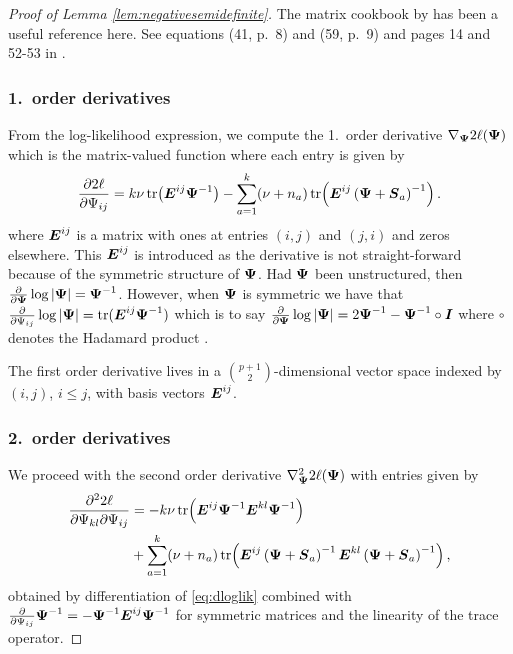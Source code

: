 \documentclass{article}\usepackage[]{graphicx}\usepackage[]{color}
\begin{document}
\begin{proof}[Proof of Lemma \ref{lem:negativesemidefinite}]

The matrix cookbook by \citet{Petersen2008} has been a useful reference here. See equations (41, p.\ 8) and (59, p.\ 9) and pages 14 and 52-53 in \citep{Petersen2008}.

\subsubsection*{1.\ order derivatives}
From the log-likelihood expression, we compute the 1.\ order derivative $\nabla_{\boldsymbol{\Psi}} 2\ell({\boldsymbol{\Psi}})$ which is the matrix-valued function where each entry is given by
\begin{align}
  \frac{\partial 2\ell}{\partial \Psi_{ij}}
  = k\nu\operatorname*{tr}\!\left({\boldsymbol{E}}^{ij}{\boldsymbol{\Psi}}^{-1}\right)
    - \sum_{a = 1}^k (\nu + n_a)\operatorname*{tr}\!\left({\boldsymbol{E}}^{ij}\left({\boldsymbol{\Psi}} + {\boldsymbol{S}}_a\right)^{-1}\right).
\label{eq:dloglik}
\end{align}
where ${\boldsymbol{E}}^{ij}$ is a matrix with ones at entries $(i,j)$ and $(j,i)$ and zeros elsewhere.
This ${\boldsymbol{E}}^{ij}$ is introduced as the derivative is not straight-forward because of the symmetric structure of ${\boldsymbol{\Psi}}$. Had ${\boldsymbol{\Psi}}$ been unstructured, then $\frac{\partial}{\partial {\boldsymbol{\Psi}}}\log|{\boldsymbol{\Psi}}| = {\boldsymbol{\Psi}}^{-1}$.
However, when ${\boldsymbol{\Psi}}$ is symmetric we have that $\frac{\partial}{\partial \Psi_{ij}}\log|{\boldsymbol{\Psi}}| = \operatorname*{tr}({\boldsymbol{E}}^{ij}{\boldsymbol{\Psi}}^{-1})$ which is to say $\frac{\partial}{\partial {\boldsymbol{\Psi}}}\log|{\boldsymbol{\Psi}}| = 2{\boldsymbol{\Psi}}^{-1} -{\boldsymbol{\Psi}}^{-1} \circ {\boldsymbol{I}}$ where $\circ$ denotes the Hadamard product \citep[eq.\ (43) and (141)]{Petersen2008}.

The first order derivative lives in a $\binom{p+1}{2}$-dimensional vector space indexed by $(i,j)$, $i\leq j$, with basis vectors ${\boldsymbol{E}}^{ij}$.




\subsubsection*{2.\ order derivatives}
We proceed with the second order derivative $\nabla^2_{\boldsymbol{\Psi}} 2\ell({\boldsymbol{\Psi}})$ with entries given by
\begin{align*}
  \frac{\partial^2 2\ell}{\partial \Psi_{kl} \partial \Psi_{ij}}
  &= - k\nu\operatorname*{tr}\!\left( {\boldsymbol{E}}^{ij}{\boldsymbol{\Psi}}^{-1} {\boldsymbol{E}}^{kl}{\boldsymbol{\Psi}}^{-1} \right) \\
  & + \sum_{a = 1}^k (\nu + n_a)
    \operatorname*{tr}\!\left(
      {\boldsymbol{E}}^{ij}\left({\boldsymbol{\Psi}} + {\boldsymbol{S}}_a\right)^{-1}
      {\boldsymbol{E}}^{kl}\left({\boldsymbol{\Psi}} + {\boldsymbol{S}}_a\right)^{-1}
    \right),
\end{align*}
obtained by differentiation of \eqref{eq:dloglik} combined with
$\frac{\partial}{\partial \Psi_{ij}} {\boldsymbol{\Psi}}^{-1} = - {\boldsymbol{\Psi}}^{-1}{\boldsymbol{E}}^{ij}{\boldsymbol{\Psi}}^{-1}$
for symmetric matrices \citep[eq.\ (40)]{Petersen2008} and the linearity of the trace operator.


\end{proof}
\end{document}
